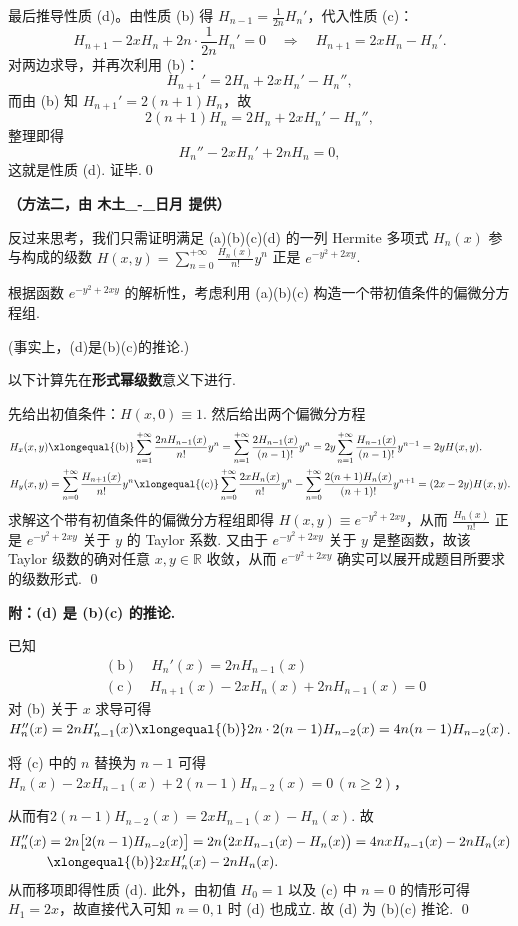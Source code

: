 \begin{enumerate}
最后推导性质 (d)。由性质 (b) 得 $\displaystyle H_{n-1} = \frac{1}{2n}H_n'$，代入性质 (c)：
\[
H_{n+1} - 2x H_n + 2n\cdot\frac{1}{2n}H_n' = 0
\quad\Longrightarrow\quad H_{n+1} = 2x H_n - H_n'.
\]
对两边求导，并再次利用 (b)：
\[
H_{n+1}' = 2H_n + 2x H_n' - H_n'',
\]
而由 (b) 知 $H_{n+1}' = 2(n+1)H_n$，故
\[
2(n+1)H_n = 2H_n + 2x H_n' - H_n'',
\]
整理即得
\[
H_n'' - 2x H_n' + 2n H_n = 0,
\]
这就是性质 (d). 证毕.\qed

\textbf{（方法二，由 木土_-_日月 提供）}

反过来思考，我们只需证明满足 (a)(b)(c)(d) 的一列 Hermite 多项式 $H_n(x)$ 参与构成的级数 $\displaystyle H(x,y)=\sum_{n=0}^{+\infty}\frac{H_n(x)}{n!}y^n$ 正是 $\displaystyle e^{-y^2+2xy}$. 

根据函数 $\displaystyle e^{-y^2+2xy}$ 的解析性，考虑利用 (a)(b)(c) 构造一个带初值条件的偏微分方程组. 

(事实上，(d)是(b)(c)的推论.) 

以下计算先在\textbf{形式幂级数}意义下进行.

先给出初值条件：$\displaystyle H(x,0)\equiv 1$. 
然后给出两个偏微分方程
\[
\begin{aligned}
H_x(x,y)
&\xlongequal{\mathrm{(b)}}\sum_{n=1}^{+\infty}\frac{2nH_{n-1}(x)}{n!}y^n
=\sum_{n=1}^{+\infty}\frac{2H_{n-1}(x)}{(n-1)!}y^n
=2y\sum_{n=1}^{+\infty}\frac{H_{n-1}(x)}{(n-1)!}y^{n-1}
=2yH(x,y).\\
H_y(x,y)&=\sum_{n=0}^{+\infty}\frac{H_{n+1}(x)}{n!}y^{n}\xlongequal{\mathrm{(c)}}\sum_{n=0}^{+\infty}\frac{2xH_n(x)}{n!}y^n-\sum_{n=0}^{+\infty}\frac{2(n+1)H_{n}(x)}{(n+1)!}y^{n+1}=(2x-2y)H(x,y).
\end{aligned}
\]
求解这个带有初值条件的偏微分方程组即得 $\displaystyle H(x,y)\equiv e^{-y^2+2xy}$，从而 $\displaystyle \frac{H_n(x)}{n!}$ 正是
$e^{-y^2+2xy}$ 关于 $y$ 的 Taylor 系数.
又由于 $e^{-y^2+2xy}$ 关于 $y$ 是整函数，故该 Taylor 级数的确对任意 $x,y\in\mathbb R$ 收敛，从而 $e^{-y^2+2xy}$ 确实可以展开成题目所要求的级数形式.
\qed

\textbf{附：(d) 是 (b)(c) 的推论.}

已知
\[
\begin{aligned}
& \mathrm{(b)} \quad H_n'(x) = 2n H_{n-1}(x) \\
& \mathrm{(c)} \quad H_{n+1}(x) - 2x H_n(x) + 2n H_{n-1}(x) = 0 
\end{aligned}
\]
对 (b) 关于 $x$ 求导可得 $H_n''(x) = 2n H_{n-1}'(x)\xlongequal{\mathrm{(b)}}2n \cdot 2(n-1) H_{n-2}(x) = 4n(n-1) H_{n-2}(x)$.

将 (c) 中的 $n$ 替换为 $n-1$ 可得
$H_n(x) - 2x H_{n-1}(x) + 2(n-1) H_{n-2}(x) = 0\,(n\geq 2)$，

从而有$ 2(n-1) H_{n-2}(x) = 2x H_{n-1}(x) - H_n(x)$.
故
\[
\begin{aligned}
H_n''(x) &= 2n\bigl[2(n-1) H_{n-2}(x)\bigr] = 2n\bigl(2x H_{n-1}(x) - H_n(x)\bigr) = 4nx H_{n-1}(x) - 2n H_n(x)\\ &\xlongequal{\mathrm{(b)}} 2x H_n'(x) - 2n H_n(x).
\end{aligned}
\]
从而移项即得性质 (d).
此外，由初值 $H_0=1$ 以及 (c) 中 $n=0$ 的情形可得 $H_1=2x$，故直接代入可知 $n=0,1$ 时 (d) 也成立.
故 (d) 为 (b)(c) 推论. \qed
\end{enumerate}